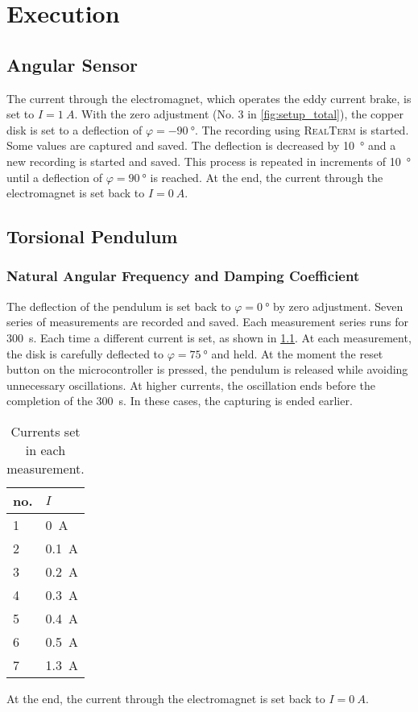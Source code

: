\chapter{Execution}
    \section{Angular Sensor}
        The current through the electromagnet, which operates the eddy current brake, is set to \(I = \SI{1}{A}\). With the
        zero adjustment (No. 3 in \cref{fig:setup_total}), the copper disk is set to a deflection of \(\varphi = \SI{-90}{\degree}\).
        The recording using \textsc{RealTerm} is started. Some values are captured and saved. The deflection is decreased by \SI{10}{\degree}
        and a new recording is started and saved. This process is repeated in increments of \SI{10}{\degree} until a deflection of
        \(\varphi = \SI{+90}{\degree}\) is reached. At the end, the current through the electromagnet is set back to \(I = \SI{0}{A}\).
%
    \section{Torsional Pendulum}
        \subsection{Natural Angular Frequency and Damping Coefficient}
            The deflection of the pendulum is set back to \(\varphi = \SI{0}{\degree}\) by zero adjustment. Seven series of measurements
            are recorded and saved. Each measurement series runs for \SI{300}{s}. Each time a different current is set, as shown
            in \cref{tab:currents}. At each measurement, the disk is carefully deflected to \(\varphi = \SI{75}{\degree}\) and
            held. At the moment the reset button on the microcontroller is pressed, the pendulum is released while avoiding
            unnecessary oscillations. At higher currents, the oscillation ends before the completion of the \SI{300}{s}. In these cases, the
            capturing is ended earlier.
        \begin{table}[H]
            \centering
            \caption[Currents set]{Currents set in each measurement.}
            \label{tab:currents}
            \begin{tabular}{@{}ll@{}}
                \toprule
                no.     & $I$\\
                \midrule
                1       & \SI{0}{A}\\
                2       & \SI{0.1}{A}\\
                3       & \SI{0.2}{A}\\
                4       & \SI{0.3}{A}\\
                5       & \SI{0.4}{A}\\
                6       & \SI{0.5}{A}\\
                7       & \SI{1.3}{A}\\
                \bottomrule
            \end{tabular}
        \end{table}
        At the end, the current through the electromagnet is set back to \(I = \SI{0}{A}\).
